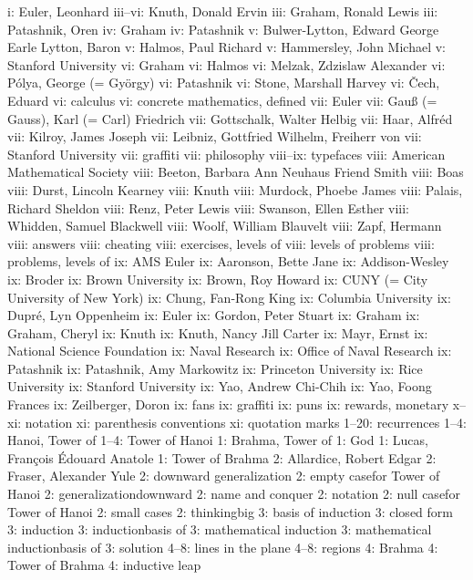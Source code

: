 i: Euler, Leonhard
iii--vi: Knuth, Donald Ervin
iii: Graham, Ronald Lewis
iii: Patashnik, Oren
iv: Graham
iv: Patashnik
v: Bulwer-Lytton, Edward George Earle Lytton, Baron
v: Halmos, Paul Richard
v: Hammersley, John Michael
v: Stanford University
vi: Graham
vi: Halmos
vi: Melzak, Zdzislaw Alexander
vi: P\'olya, George (= Gy\"orgy)
vi: Patashnik
vi: Stone, Marshall Harvey
vi: \v{C}ech, Eduard
vi: calculus
vi: concrete mathematics, defined
vii: Euler
vii: Gau{\ss} (= Gauss), Karl (= Carl) Friedrich
vii: Gottschalk, Walter Helbig
vii: Haar, Alfr\'ed
vii: Kilroy, James Joseph
vii: Leibniz, Gottfried Wilhelm, Freiherr von
vii: Stanford University
vii: graffiti
vii: philosophy
viii--ix: typefaces
viii: American Mathematical Society
viii: Beeton, Barbara Ann Neuhaus Friend Smith
viii: Boas
viii: Durst, Lincoln Kearney
viii: Knuth
viii: Murdock, Phoebe James
viii: Palais, Richard Sheldon
viii: Renz, Peter Lewis
viii: Swanson, Ellen Esther
viii: Whidden, Samuel Blackwell
viii: Woolf, William Blauvelt
viii: Zapf, Hermann
viii: answers
viii: cheating
viii: exercises, levels of
viii: levels of problems
viii: problems, levels of
ix: AMS Euler
ix: Aaronson, Bette Jane
ix: Addison-Wesley
ix: Broder
ix: Brown University
ix: Brown, Roy Howard
ix: CUNY (= City University of New York)
ix: Chung, Fan-Rong King
ix: Columbia University
ix: Dupr\'e, Lyn Oppenheim
ix: Euler
ix: Gordon, Peter Stuart
ix: Graham
ix: Graham, Cheryl
ix: Knuth
ix: Knuth, Nancy Jill Carter
ix: Mayr, Ernst
ix: National Science Foundation
ix: Naval Research
ix: Office of Naval Research
ix: Patashnik
ix: Patashnik, Amy Markowitz
ix: Princeton University
ix: Rice University
ix: Stanford University
ix: Yao, Andrew Chi-Chih
ix: Yao, Foong Frances
ix: Zeilberger, Doron
ix: fans
ix: graffiti
ix: puns
ix: rewards, monetary
x--xi: notation
xi: parenthesis conventions
xi: quotation marks
  1--20: recurrences
  1--4: Hanoi, Tower of
  1--4: Tower of Hanoi
  1: Brahma, Tower of
  1: God
  1: Lucas, Fran\c cois \'Edouard Anatole
  1: Tower of Brahma
  2: Allardice, Robert Edgar
  2: Fraser, Alexander Yule
  2: downward generalization
  2: empty case\sub for Tower of Hanoi
  2: generalization\sub downward
  2: name and conquer
  2: notation
  2: null case\sub for Tower of Hanoi
  2: small cases
  2: thinking\sub big
  3: basis of induction
  3: closed form
  3: induction
  3: induction\sub basis of
  3: mathematical induction
  3: mathematical induction\sub basis of
  3: solution
  4--8: lines in the plane
  4--8: regions
  4: Brahma
  4: Tower of Brahma
  4: inductive leap
